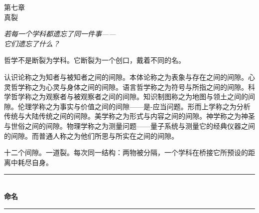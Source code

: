 \documentclass[10pt, openany, oneside]{book}
\renewcommand{\normalsize}{\fontsize{10}{13}\selectfont}
\renewcommand{\large}{\fontsize{11.5}{14}\selectfont}
\renewcommand{\huge}{\fontsize{17}{21}\selectfont}
\begin{document}
%
%
%

\newpage

\begin{center}
    {\huge\scshape 第七章}\\[0.3em]
    {\large\scshape 真裂}
\end{center}

\vspace{1.5em}

\begin{center}
    \itshape
    若每一个学科都遗忘了同一件事——\\
    它们遗忘了什么？
\end{center}

\vspace{2em}


\noindent 哲学不是断裂为学科。它断裂为一个创口，戴着不同的名。

认识论称之为知者与被知者之间的间隙。本体论称之为表象与存在之间的间隙。心灵哲学称之为心灵与身体之间的间隙。语言哲学称之为符号与所指之间的间隙。科学哲学称之为观察者与被观察者之间的间隙。知识制图称之为地图与领土之间的间隙。伦理学称之为事实与价值之间的间隙——是-应当问题。形而上学称之为分析传统与大陆传统之间的间隙。美学称之为形式与内容之间的间隙。神学称之为神圣与世俗之间的间隙。物理学称之为测量问题——量子系统与测量它的经典仪器之间的间隙。而普通人称之为他们所思与所实在之间的间隙。

十二个间隙。一道裂。每次同一结构：两物被分隔，一个学科在桥接它所预设的距离中耗尽自身。

\vspace{1.5em}


\begin{center}
    \rule{0.3\textwidth}{0.4pt}\\[0.5em]
    {\normalsize\bfseries\scshape 命名}\\[0.3em]
    \rule{0.3\textwidth}{0.4pt}
\end{center}
\end{document}
